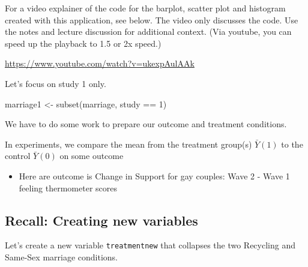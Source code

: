 \documentclass[
  letterpaper,
  DIV=11,
  numbers=noendperiod]{scrreprt}
\newenvironment{Shaded}{\begin{snugshade}}{\end{snugshade}}
\newcommand{\DecValTok}[1]{\textcolor[rgb]{0.68,0.00,0.00}{#1}}
\newcommand{\FunctionTok}[1]{\textcolor[rgb]{0.28,0.35,0.67}{#1}}
\newcommand{\NormalTok}[1]{\textcolor[rgb]{0.00,0.23,0.31}{#1}}
\newcommand{\OtherTok}[1]{\textcolor[rgb]{0.00,0.23,0.31}{#1}}
\newcommand{\SpecialCharTok}[1]{\textcolor[rgb]{0.37,0.37,0.37}{#1}}
\providecommand{\tightlist}{%
  \setlength{\itemsep}{0pt}\setlength{\parskip}{0pt}}\usepackage{longtable,booktabs,array}
\begin{document}
For a video explainer of the code for the barplot, scatter plot and
histogram created with this application, see below. The video only
discusses the code. Use the notes and lecture discussion for additional
context. (Via youtube, you can speed up the playback to 1.5 or 2x
speed.)

\url{https://www.youtube.com/watch?v=ukexpAulAAk}

Let's focus on study 1 only.

\begin{Shaded}
\begin{Highlighting}[]
\NormalTok{marriage1 }\OtherTok{\textless{}{-}} \FunctionTok{subset}\NormalTok{(marriage, study }\SpecialCharTok{==}  \DecValTok{1}\NormalTok{)}
\end{Highlighting}
\end{Shaded}

We have to do some work to prepare our outcome and treatment conditions.

In experiments, we compare the mean from the treatment group(s)
\(\bar{Y}(1)\) to the control \(\bar{Y}(0)\) on some outcome

\begin{itemize}
\tightlist
\item
  Here are outcome is Change in Support for gay couples: Wave 2 - Wave 1
  feeling thermometer scores
\end{itemize}

\begin{Shaded}
\end{Shaded}

\hypertarget{recall-creating-new-variables}{%
\subsection{Recall: Creating new
variables}\label{recall-creating-new-variables}}

Let's create a new variable \texttt{treatmentnew} that collapses the two
Recycling and Same-Sex marriage conditions.
\end{document}
